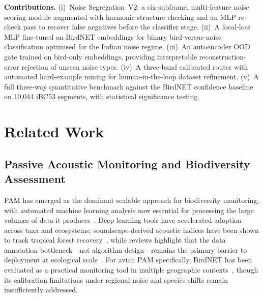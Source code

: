 \documentclass[conference]{IEEEtran}
\begin{document}
\textbf{Contributions.} (i)~Noise Segregation~V2: a six-subframe, multi-feature noise scoring module augmented with harmonic structure checking and an MLP re-check pass to recover false negatives before the classifier stage. (ii)~A focal-loss MLP fine-tuned on BirdNET embeddings for binary bird-versus-noise classification optimised for the Indian noise regime. (iii)~An autoencoder OOD gate trained on bird-only embeddings, providing interpretable reconstruction-error rejection of unseen noise types. (iv)~A three-band calibrated router with automated hard-example mining for human-in-the-loop dataset refinement. (v)~A full three-way quantitative benchmark against the BirdNET confidence baseline on 10,044 iBC53 segments, with statistical significance testing.

\section{Related Work}

\subsection{Passive Acoustic Monitoring and Biodiversity Assessment}
PAM has emerged as the dominant scalable approach for biodiversity monitoring, with automated machine learning analysis now essential for processing the large volumes of data it produces~\cite{Kershenbaum2025,Rasmussen2024}. Deep learning tools have accelerated adoption across taxa and ecosystems; soundscape-derived acoustic indices have been shown to track tropical forest recovery~\cite{Denton2023}, while reviews highlight that the data annotation bottleneck---not algorithm design---remains the primary barrier to deployment at ecological scale~\cite{Kershenbaum2025}. For avian PAM specifically, BirdNET has been evaluated as a practical monitoring tool in multiple geographic contexts~\cite{PerezGranados2023sensor}, though its calibration limitations under regional noise and species shifts remain insufficiently addressed.
\end{document}
